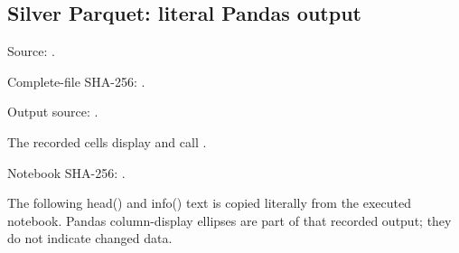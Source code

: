 \subsection{Silver Parquet: literal Pandas output}

Source: .

Complete-file SHA-256: .

Output source: .

The recorded cells display  and call .

Notebook SHA-256: .

The following head() and info() text is copied literally from the executed notebook. Pandas column-display ellipses are part of that recorded output; they do not indicate changed data.


